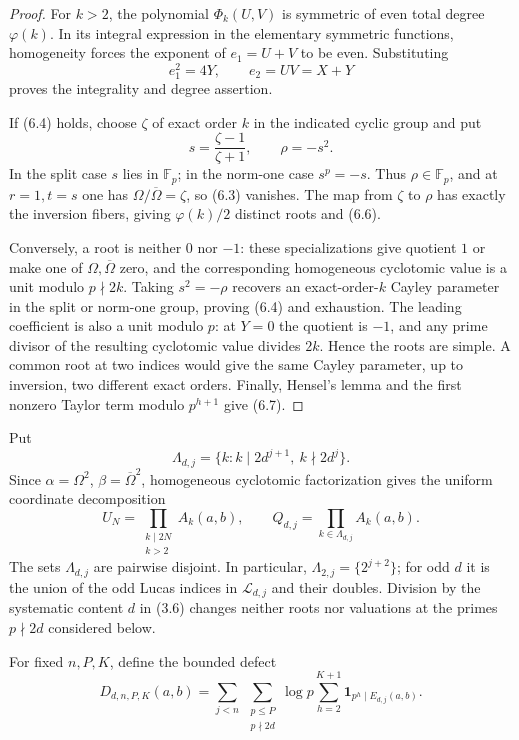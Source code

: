 \documentclass[11pt]{article}
\theoremstyle{definition}
\theoremstyle{remark}
\begin{document}
\begin{proof}
For $k>2$, the polynomial \(\Phi_k(U,V)\) is symmetric of even total
degree \(\varphi(k)\).  In its integral expression in the elementary
symmetric functions, homogeneity forces the exponent of
\(e_1=U+V\) to be even.  Substituting
\[
 e_1^2=4Y,\qquad e_2=UV=X+Y
\]
proves the integrality and degree assertion.

If (6.4) holds, choose \(\zeta\) of exact order $k$ in the indicated
cyclic group and put
\[
 s=\frac{\zeta-1}{\zeta+1},\qquad \rho=-s^2.
\]
In the split case $s$ lies in \(\mathbb F_p\); in the norm-one case
\(s^p=-s\).  Thus \(\rho\in\mathbb F_p\), and at \(r=1,t=s\) one has
\(\Omega/\overline\Omega=\zeta\), so (6.3) vanishes.  The map from
\(\zeta\) to \(\rho\) has exactly the inversion fibers, giving
\(\varphi(k)/2\) distinct roots and (6.6).

Conversely, a root is neither $0$ nor $-1$: these specializations give
quotient $1$ or make one of \(\Omega,\overline\Omega\) zero, and the
corresponding homogeneous cyclotomic value is a unit modulo
\(p\nmid2k\).  Taking \(s^2=-\rho\) recovers an exact-order-$k$
Cayley parameter in the split or norm-one group, proving (6.4) and
exhaustion.  The leading coefficient is also a unit modulo $p$: at
\(Y=0\) the quotient is $-1$, and any prime divisor of the resulting
cyclotomic value divides $2k$.  Hence the roots are simple.  A common
root at two indices would give the same Cayley parameter, up to
inversion, two different exact orders.  Finally, Hensel's lemma and the
first nonzero Taylor term modulo \(p^{h+1}\) give (6.7).
\end{proof}

Put
\[
 \Lambda_{d,j}
 =\{k:k\mid2d^{j+1},\ k\nmid2d^j\}.
 \tag{6.8}
\]
Since \(\alpha=\Omega^2\), \(\beta=\overline\Omega^2\), homogeneous
cyclotomic factorization gives the uniform coordinate decomposition
\[
 U_N=\prod_{\substack{k\mid2N\\k>2}}A_k(a,b),
 \qquad
 Q_{d,j}=\prod_{k\in\Lambda_{d,j}}A_k(a,b).
 \tag{6.9}
\]
The sets \(\Lambda_{d,j}\) are pairwise disjoint.  In particular,
\(\Lambda_{2,j}=\{2^{j+2}\}\); for odd $d$ it is the union of the
odd Lucas indices in \(\mathcal L_{d,j}\) and their doubles.  Division
by the systematic content $d$ in (3.6) changes neither roots nor
valuations at the primes \(p\nmid2d\) considered below.

For fixed $n,P,K$, define the bounded defect
\[
 D_{d,n,P,K}(a,b)=
 \sum_{j<n}\ \sum_{\substack{p\le P\\p\nmid2d}}
 \log p\sum_{h=2}^{K+1}\mathbf 1_{p^h\mid E_{d,j}(a,b)}.
 \tag{6.10}
\]
\end{document}

